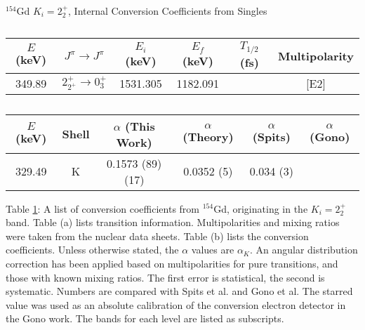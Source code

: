 \begin{table}
    \centering
    \caption{$^{154}$Gd $K_i=2^+_2$, Internal Conversion Coefficients from Singles}
    \label{tab:154Gd_Single_22_Disc}
\begin{ThreePartTable}
    \begin{subtable}{\textwidth}
        \caption{}
    \begin{tabular}{c|c|c|c|c|c}
        \toprule
        $E$ (keV)	&	$J^{\pi}	\rightarrow	J^{\pi}$	&	$E_i$ (keV)	&	$E_f$ (keV)	&	$T_{1/2}$ (fs)	&	Multipolarity	\\
        \hline
        349.89	&	$2^+_{2^+}	\rightarrow	0^+_{3}$	&	1531.305	&	1182.091	&		&	[E2]	\\
        \bottomrule
    \end{tabular}
    \end{subtable}
    \end{ThreePartTable}
\end{table}
\begin{table}
    \ContinuedFloat
    \begin{subtable}{\textwidth}
    \end{subtable}
    \begin{ThreePartTable}
    \begin{subtable}{\textwidth}
        \caption{}
        \begin{tabular}{c|c|c|c|c|c}
            \toprule
            $E$ (keV) & Shell &	$\alpha$ (This Work)	&	$\alpha$  (Theory)\citep{kibedi08:_BRICC}	&	$\alpha$ (Spits)\citep{spits96:_154gd} & $\alpha$ (Gono)\citep{gono74:_154gd_e0}		\\
            \hline
            329.49	 & K &	0.1573	(89) (17)	&	0.0352 (5)	&	0.034 (3)	\\
            \bottomrule
        \end{tabular}
        \end{subtable}

        \makeatletter\def\TPT@hsize{}\makeatletter

        \begin{tablenotes}[para]
            Table \ref{tab:154Gd_Single_22_Disc}: A list of conversion coefficients from $^{154}$Gd, originating in the $K_i=2^+_2$ band. Table (a) lists transition information. Multipolarities and mixing ratios were taken from the nuclear data sheets\citep{reich09:_nds_154}. Table (b) lists the conversion coefficients. Unless otherwise stated, the $\alpha$ values are $\alpha_K$. An angular distribution correction has been applied based on multipolarities for pure transitions, and those with known mixing ratios. The first error is statistical, the second is systematic. Numbers are compared with Spits et al.\citep{spits96:_154gd} and Gono et al.\citep{gono74:_154gd_e0} The starred value was used as an absolute calibration of the conversion electron detector in the Gono work. The bands for each level are listed as subscripts.
        \end{tablenotes}
\end{ThreePartTable}
\end{table}
